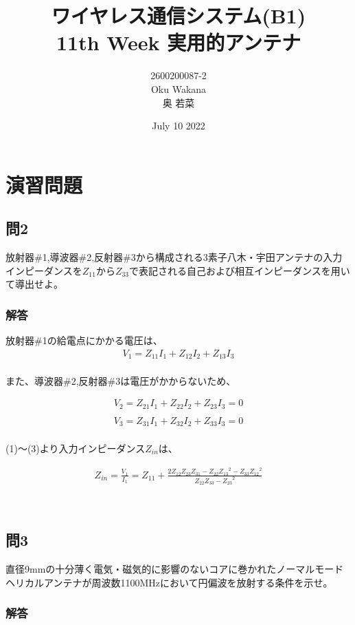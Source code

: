 \documentclass[dvipdfmx,autodetect-engine,titlepage]{jsarticle}
\title{ワイヤレス通信システム(B1)\\
11th Week 実用的アンテナ\\
}
\author{2600200087-2\\Oku Wakana\\奥 若菜}
\date{July 10 2022}
\begin{document}
\maketitle
\section*{演習問題}
\subsection*{問2}
放射器\#1,導波器\#2,反射器\#3から構成される3素子八木・宇田アンテナの入力インピーダンスを\begin{math}
  Z_{11}からZ_{33}
\end{math}で表記される自己および相互インピーダンスを用いて導出せよ。

\subsubsection*{解答}
放射器\#1の給電点にかかる電圧は、
\begin{eqnarray}
  V_1 = Z_{11}I_1 + Z_{12}I_2 + Z_{13}I_3
\end{eqnarray}
　\\
また、導波器\#2,反射器\#3は電圧がかからないため、

\begin{eqnarray}
  V_2 = Z_{21}I_1 + Z_{22}I_2 + Z_{23}I_3 = 0\\\nonumber\\
  V_3 = Z_{31}I_1 + Z_{32}I_2 + Z_{33}I_3 = 0
\end{eqnarray}
　\\
(1)〜(3)より入力インピーダンス\begin{math}
  Z_{in}
\end{math}は、

\begin{eqnarray*}
  Z_{in} = \frac{V_1}{I_1} = Z_{11} + \frac{2Z_{12}Z_{23}Z_{31} - Z_{22}{Z_{13}}^2 - Z_{33}{Z_{12}}^2}{Z_{22}Z_{33}-{Z_{23}}^2}
\end{eqnarray*}

　\\
\subsection*{問3}
直径9mmの十分薄く電気・磁気的に影響のないコアに巻かれたノーマルモードヘリカルアンテナが周波数1100MHzにおいて円偏波を放射する条件を示せ。

\subsubsection*{解答}
\end{document}
